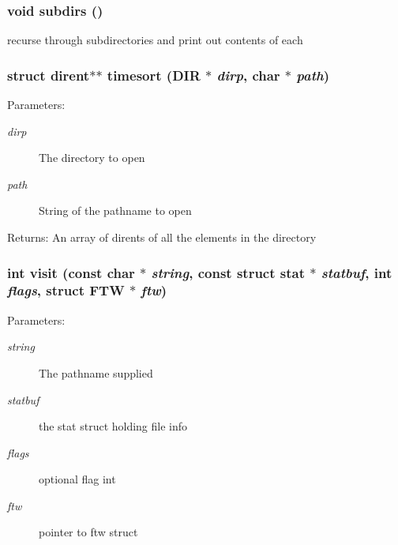\subsubsection{\setlength{\rightskip}{0pt plus 5cm}void subdirs ()}\label{dir_8h_10a72ffadf5d8b455877bf1757b31cfb}


recurse through subdirectories and print out contents of each 
\subsubsection{\setlength{\rightskip}{0pt plus 5cm}struct dirent$\ast$$\ast$ timesort (DIR $\ast$ {\em dirp}, char $\ast$ {\em path})}\label{dir_8h_a8c9478da23709170570587079d936d9}


\begin{Desc}
\item[Parameters:]
\begin{description}
\item[{\em dirp}]The directory to open \item[{\em path}]String of the pathname to open \end{description}
\end{Desc}
\begin{Desc}
\item[Returns:]An array of dirents of all the elements in the directory \end{Desc}
\subsubsection{\setlength{\rightskip}{0pt plus 5cm}int visit (const char $\ast$ {\em string}, const struct stat $\ast$ {\em statbuf}, int {\em flags}, struct FTW $\ast$ {\em ftw})}\label{dir_8h_6aaafc14235ec222b836a0c2904754c4}


\begin{Desc}
\item[Parameters:]
\begin{description}
\item[{\em string}]The pathname supplied \item[{\em statbuf}]the stat struct holding file info \item[{\em flags}]optional flag int \item[{\em ftw}]pointer to ftw struct \end{description}
\end{Desc}
